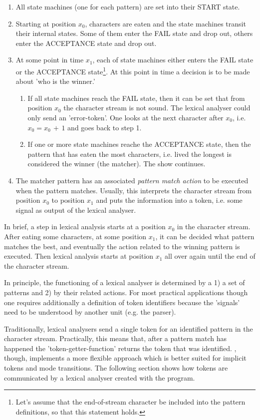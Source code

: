 \begin{enumerate}
\item All state machines (one for each pattern) are set into their {\sf START}
 state.
\item Starting at position $x_0$, characters are eaten and the state machines
  transit their internal states. Some of them enter the {\sf FAIL} state and
  drop out, others enter the {\sf ACCEPTANCE} state and drop out.
\item At some point in time $x_1$, each of state machines either enters the
  {\sf FAIL} state or the {\sf ACCEPTANCE} state\footnote{Let's assume that the
    end-of-stream character be included into the pattern definitions, so that
    this statement holds.}. At this point in time a decision is to be made
  about 'who is the winner.'
  \begin{enumerate}
  \item If all state machines reach the {\sf FAIL} state, then it can be set
    that from position $x_0$ the character stream is not sound. The lexical
    analyser could only send an 'error-token'. One looks at the next character
    after $x_0$, i.e. $x_0 = x_0 \,+\,1$ and goes back to step 1.
  \item If one or more state machines reache the {\sf ACCEPTANCE} state, then the
    pattern that has eaten the most characters, i.e. lived the longest is
    considered the winner (the matcher). The show continues.
  \end{enumerate}
\item The matcher pattern has an associated {\it pattern match action} to be
  executed when the pattern matches. Usually, this interprets the
  character stream from position $x_0$ to position $x_1$ and puts the
  information into  a token, i.e. some signal as output of the lexical analyser.
\end{enumerate}

In brief, a step in lexical analysis starts at a position $x_0$ in the
character stream. After eating some characters, at some position $x_1$, it can
be decided what pattern matches the best, and eventually the action related to
the winning pattern is executed. Then lexical analysis starts at position $x_1$
all over again until the end of the character stream.

In principle, the functioning of a lexical analyser is determined by a 1) a
set of patterns and 2) by their related actions. For most practical
applications though one requires additionally a definition of token
identifiers because the 'signals' need to be understood by another unit (e.g.
the parser).

Traditionally, lexical analysers send a single token for an identified pattern
in the character stream. Practically, this means that, after a pattern match
has happened the 'token-getter-function' returns the token that was identified.
{\Quex}, though, implements a more flexible approach which is better suited
for implicit tokens and mode transitions. The following section shows how
tokens are communicated by a lexical analyser created with the {\quex}
program.

